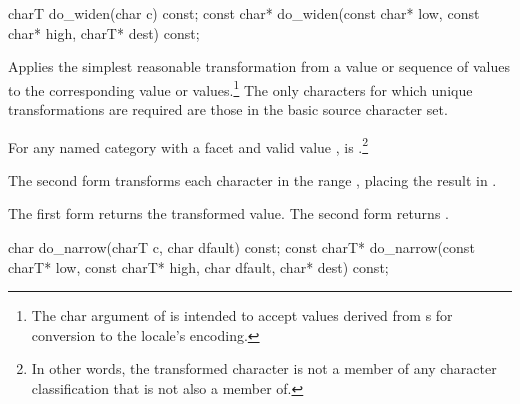 %
\begin{itemdecl}
charT        do_widen(char c) const;
const char*  do_widen(const char* low, const char* high, charT* dest) const;
\end{itemdecl}

\begin{itemdescr}
\pnum
\effects
Applies the simplest reasonable transformation from a
value or sequence of
values to the corresponding
value or values.\footnote{The char argument of
is intended to accept values derived from s for conversion
to the locale's encoding.}
The only characters for which unique transformations are required
are those in the basic source character set.

For any named
category with a
facet  and valid
value ,
is
.\footnote{In other words, the transformed character is not a member
of any character classification that  is not also a member of.}

The second form transforms each character
in the range
,
placing the result in
.

\pnum
\returns
The first form returns the transformed value.
The second form returns .
\end{itemdescr}

%
\begin{itemdecl}
char         do_narrow(charT c, char dfault) const;
const charT* do_narrow(const charT* low, const charT* high, char dfault, char* dest) const;
\end{itemdecl}

